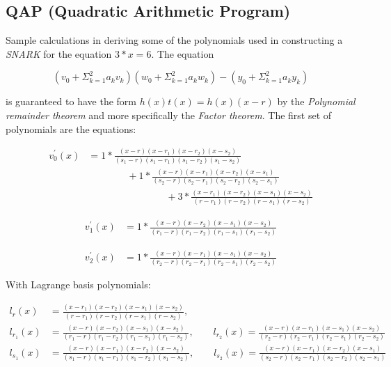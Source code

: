 \documentclass{article}
\begin{document}

\subsection*{QAP (Quadratic Arithmetic Program)}

\noindent Sample calculations in deriving some of the polynomials used in
constructing a \textit{SNARK} for the equation $ 3 * x = 6 $. The equation

\[
    (v_{0} + \Sigma_{k = 1}^{2} a_{k} v_{k}) (w_{0} + \Sigma_{k = 1}^{2} a_{k} w_{k}) - (y_{0} + \Sigma_{k = 1}^{2} a_{k} y_{k})
\]

\noindent is guaranteed to have the form $ h(x) t(x) = h(x) (x - r) $ by the
\textit{Polynomial remainder theorem} and more specifically the
\textit{Factor theorem}. The first set of polynomials are the equations:

\begin{align*}
    v^{'}_{0}(x) & = 1 * \frac{(x  -  r) (x  - r_{1}) (x - r_{2}) (x  - s_{2})}{(s_{1} -  r) (s_{1} - r_{1}) (s_{1} - r_{2}) (s_{1} - s_{2})} \\
    & \qquad \qquad + 1 * \frac{(x  -  r) (x  - r_{1}) (x  - r_{2}) (x  - s_{1})}{(s_{2} -  r) (s_{2} - r_{1}) (s_{2} - r_{2}) (s_{2} - s_{1})} \\
    & \qquad \qquad \qquad \qquad + 3 * \frac{ (x  - r_{1}) (x  - r_{2}) (x  - s_{1}) (x  - s_{2})}{(r  - r_{1}) (r  - r_{2}) (r  - s_{1}) (r  - s_{2})}
\end{align*}

\begin{align*}
    v^{'}_{1}(x) &= 1 * \frac{(x  -  r) (x  - r_{2}) (x  - s_{1}) (x  - s_{2})}{(r_{1} -  r) (r_{1} - r_{2}) (r_{1} - s_{1}) (r_{1} - s_{2})}
\end{align*}

\begin{align*}
    v^{'}_{2}(x) &= 1 * \frac{(x  -  r) (x  - r_{1}) (x  - s_{1}) (x  - s_{2})}{(r_{2} -  r) (r_{2} - r_{1}) (r_{2} - s_{1}) (r_{2} - s_{2})}
\end{align*}

\noindent With Lagrange basis polynomials:

\begin{align*}
    l_{r}(x) &= \frac{ (x  - r_{1}) (x  - r_{2}) (x  - s_{1}) (x  - s_{2})}{(r  - r_{1}) (r  - r_{2}) (r  - s_{1}) (r  - s_{2})}, \\
    l_{r_{1}}(x) &= \frac{(x  -  r) (x  - r_{2}) (x  - s_{1}) (x  - s_{2})}{(r_{1} -  r) (r_{1} - r_{2}) (r_{1} - s_{1}) (r_{1} - s_{2})},
    \qquad l_{r_{2}}(x) = \frac{(x  -  r) (x  - r_{1}) (x  - s_{1}) (x  - s_{2})}{(r_{2} -  r) (r_{2} - r_{1}) (r_{2} - s_{1}) (r_{2} - s_{2})} \\
    l_{s_{1}}(x) &= \frac{(x  -  r) (x  - r_{1}) (x - r_{2}) (x  - s_{2})}{(s_{1} -  r) (s_{1} - r_{1}) (s_{1} - r_{2}) (s_{1} - s_{2})},
    \qquad l_{s_{2}}(x) = \frac{(x  -  r) (x  - r_{1}) (x  - r_{2}) (x  - s_{1})}{(s_{2} -  r) (s_{2} - r_{1}) (s_{2} - r_{2}) (s_{2} - s_{1})} \\
\end{align*}
\end{document}
